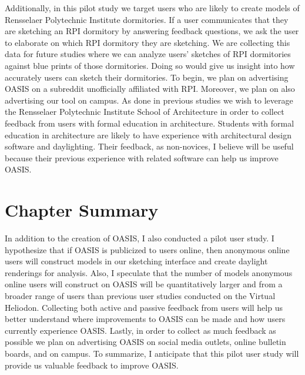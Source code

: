Additionally, in this pilot study we target users who are likely to create models of Rensselaer Polytechnic Institute dormitories. If a user communicates that they are sketching an RPI dormitory by answering feedback questions, we ask the user to elaborate on which RPI dormitory they are sketching. We are collecting this data for future studies where we can analyze users' sketches of RPI dormitories against blue prints of those dormitories. Doing so would give us insight into how accurately users can sketch their dormitories. To begin, we plan on advertising OASIS on a subreddit unofficially affiliated with RPI. Moreover, we plan on also advertising our tool on campus. As done in previous studies we wish to leverage the Rensselaer Polytechnic Institute School of Architecture in order to collect feedback from users with formal education in architecture. Students with formal education in architecture are likely to have experience with architectural design software and daylighting. Their feedback, as non-novices, I believe will be useful because their previous experience with related software can help us improve OASIS.  \\

\section{Chapter Summary}

In addition to the creation of OASIS, I also conducted a pilot user study.  I hypothesize that if OASIS is publicized to users online, then anonymous online users will construct models in our sketching interface and create daylight renderings for analysis.  Also, I speculate that the number of models anonymous online users will construct on OASIS will be quantitatively larger and from a broader range of users than previous user studies conducted on the Virtual Heliodon.  Collecting both active and passive feedback from users will help us better understand where improvements to OASIS can be made and how users currently experience OASIS.  Lastly, in order to collect as much feedback as possible we plan on advertising OASIS on social media outlets, online bulletin boards, and on campus.  To summarize, I anticipate  that this pilot user study will provide us valuable feedback to improve OASIS.  \\


